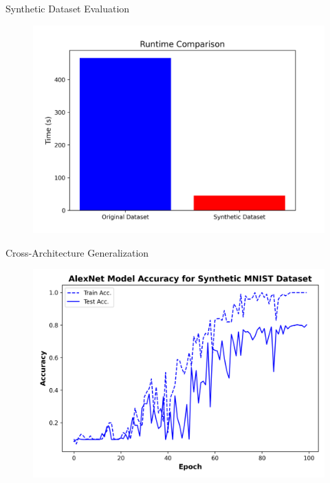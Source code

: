 \documentclass[final]{beamer}
\newlength{\colwidth}
\begin{document}
\begin{columns}
\begin{column}{\colwidth}
\begin{block}{Synthetic Dataset Evaluation}
\begin{figure}[ht]
\begin{minipage}{0.48\textwidth}
				\end{minipage}
				\hfill
				\begin{minipage}{0.48\textwidth}
					\centering
					\includegraphics[width=\textwidth]{../report/figures/mhist_syn_time.png}
					
				\end{minipage}
				
			\end{figure}
			
		\end{block}
		
		\begin{block}{Cross-Architecture Generalization}
			
			\begin{figure}[ht]
				\centering
				\begin{minipage}{0.48\textwidth}
					\centering
					\includegraphics[width=\textwidth]{../report/figures/mnist_alex_acc.png}
					

\end{minipage}
\end{figure}
\end{block}
\end{column}
\end{columns}
\end{document}
